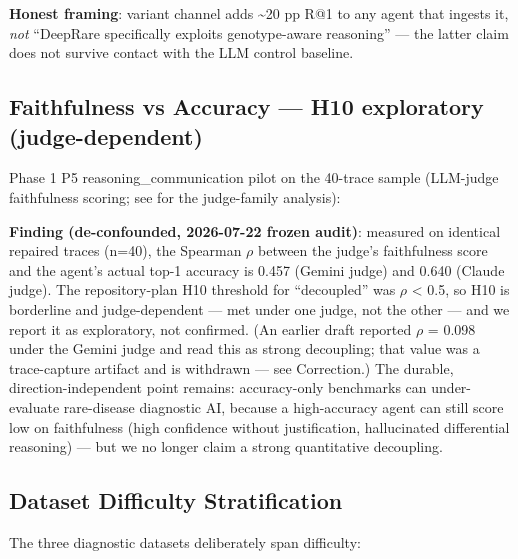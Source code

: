 \textbf{Honest framing}: variant channel adds \textasciitilde20 pp R@1 to any agent that
ingests it, \emph{not} ``DeepRare specifically exploits genotype-aware
reasoning'' --- the latter claim does not survive contact with the LLM
control baseline.

\subsection{Faithfulness vs Accuracy --- H10 exploratory (judge-dependent)}\label{sec-7-4}

Phase 1 P5 reasoning\_communication pilot on the 40-trace sample (LLM-judge
faithfulness scoring; see  for the judge-family analysis):

\textbf{Finding (de-confounded, 2026-07-22 frozen audit)}: measured on identical
repaired traces (n=40), the Spearman \ensuremath{\rho} between the judge's faithfulness score
and the agent's actual top-1 accuracy is 0.457 (Gemini judge) and 0.640 (Claude judge). The repository-plan H10 threshold for ``decoupled'' was \ensuremath{\rho} \textless{} 0.5,
so H10 is borderline and judge-dependent --- met under one judge, not the
other --- and we report it as exploratory, not confirmed. (An earlier draft
reported \ensuremath{\rho} = 0.098 under the Gemini judge and read this as strong decoupling;
that value was a trace-capture artifact and is withdrawn --- see  Correction.)
The durable, direction-independent point remains: accuracy-only benchmarks can under-evaluate rare-disease diagnostic AI, because a high-accuracy agent can
still score low on faithfulness (high confidence without justification,
hallucinated differential reasoning) --- but we no longer claim a strong
quantitative decoupling.

\subsection{Dataset Difficulty Stratification}\label{sec-7-6}

The three diagnostic datasets deliberately span difficulty:

